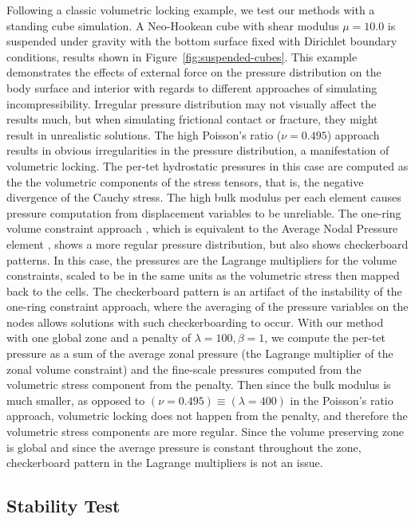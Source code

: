 Following a classic volumetric locking example, we test our methods with a standing cube simulation. A Neo-Hookean cube with shear modulus $\mu = 10.0$ is suspended under gravity with the bottom surface fixed with Dirichlet boundary conditions, results shown in Figure~\ref{fig:suspended-cubes}. This example demonstrates the effects of external force on the pressure distribution on the body surface and interior with regards to different approaches of simulating incompressibility. Irregular pressure distribution may not visually affect the results much, but when simulating frictional contact or fracture, they might result in unrealistic solutions. The high Poisson's ratio ($\nu = 0.495$) approach results in obvious irregularities in the pressure distribution, a manifestation of volumetric locking. The per-tet hydrostatic pressures in this case are computed as the the volumetric components of the stress tensors, that is, the negative divergence of the Cauchy stress. The high bulk modulus per each element causes pressure computation from displacement variables to be unreliable. The one-ring volume constraint approach \cite{Irving:2007}, which is equivalent to the Average Nodal Pressure element \cite{bonet:1998}, shows a more regular pressure distribution, but also shows checkerboard patterns. In this case, the pressures are the Lagrange multipliers for the volume constraints, scaled to be in the same units as the volumetric stress then mapped back to the cells. The checkerboard pattern is an artifact of the instability of the one-ring constraint approach, where the averaging of the pressure variables on the nodes allows solutions with such checkerboarding to occur. With our method with one global zone and a penalty of $\lambda = 100, \beta = 1$, we compute the per-tet pressure as a sum of the average zonal pressure (the Lagrange multiplier of the zonal volume constraint) and the fine-scale pressures computed from the volumetric stress component from the penalty. Then since the bulk modulus is much smaller, as opposed to $(\nu = 0.495) \equiv (\lambda = 400)$ in the Poisson's ratio approach, volumetric locking does not happen from the penalty, and therefore the volumetric stress components are more regular. Since the volume preserving zone is global and since the average pressure is constant throughout the zone, checkerboard pattern in the Lagrange multipliers is not an issue. 

\subsection{Stability Test}

